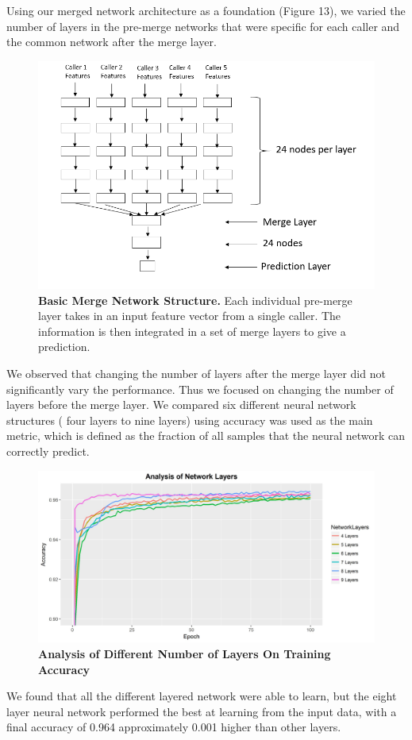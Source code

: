 \documentclass{article}
\begin{document}
Using our merged network architecture as a foundation (Figure 13), we varied the number of layers in the pre-merge networks that were specific for each caller and the common network after the merge layer.
\begin{figure}[H]
\includegraphics[width=\textwidth]{neuralnetworkarchitecturefinal.png}
\centering
\caption{\textbf{Basic Merge Network Structure.} Each individual pre-merge layer takes in an input feature vector from a single caller. The information is then integrated in a set of merge layers to give a prediction.}
\end{figure}
 We observed that changing the number of layers after the merge layer did not significantly vary the performance. Thus we focused on changing the number of layers before the merge layer. We compared six different neural network structures ( four layers to nine layers) using accuracy was used as the main metric, which is defined as the fraction of all samples that the neural network can correctly predict.
\begin{figure}[H]
\includegraphics[width=\textwidth]{networkstructuredataset.jpg}
\centering
\caption{\textbf{Analysis of Different Number of Layers On Training Accuracy}}
\end{figure}
We found that all the different layered network were able to learn, but the eight layer neural network performed the best at learning from the input data, with a final accuracy of 0.964 approximately 0.001 higher than other layers.     
\end{document}
